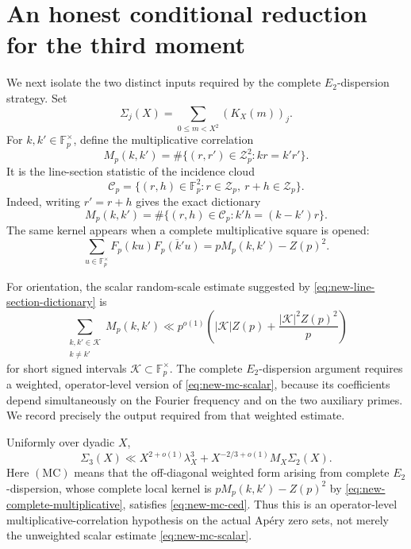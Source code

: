 \section{An honest conditional reduction for the third moment}
\label{sec:honest-hm3-reduction}

We next isolate the two distinct inputs required by the complete
\(E_2\)-dispersion strategy.  Set
\[
 \Sigma_j(X)=\sum_{0\le m<X^2}(K_X(m))_j.
\]
For \(k,k'\in\mathbb F_p^\times\), define the multiplicative
correlation
\[
 M_p(k,k')
 =\#\{(r,r')\in\mathcal Z_p^2:kr=k'r'\}.
\]
It is the line-section statistic of the incidence cloud
\[
 \mathcal C_p
 =\{(r,h)\in\mathbb F_p^2:
       r\in\mathcal Z_p,\ r+h\in\mathcal Z_p\}.
\]
Indeed, writing \(r'=r+h\) gives the exact dictionary
\begin{equation}
 M_p(k,k')
 =\#\{(r,h)\in\mathcal C_p:
        k'h=(k-k')r\}.
 \label{eq:new-line-section-dictionary}
\end{equation}
The same kernel appears when a complete multiplicative square is
opened:
\begin{equation}
 \sum_{u\in\mathbb F_p^\times}
 F_p(ku)\overline{F_p(k'u)}
 =pM_p(k,k')-Z(p)^2.
 \label{eq:new-complete-multiplicative}
\end{equation}

For orientation, the scalar random-scale estimate suggested by
\eqref{eq:new-line-section-dictionary} is
\begin{equation}
 \sum_{\substack{k,k'\in\mathscr K\\k\ne k'}}
 M_p(k,k')
 \ll p^{o(1)}
 \left(
   |\mathscr K|Z(p)
   +\frac{|\mathscr K|^2Z(p)^2}{p}
 \right)
 \label{eq:new-mc-scalar}
\end{equation}
for short signed intervals \(\mathscr K\subset\mathbb F_p^\times\).
The complete \(E_2\)-dispersion argument requires a weighted,
operator-level version of \eqref{eq:new-mc-scalar}, because its
coefficients depend simultaneously on the Fourier frequency and on
the two auxiliary primes.  We record precisely the output required
from that weighted estimate.

\begin{hypothesis}
\label{hyp:mc-ced}
Uniformly over dyadic \(X\),
\begin{equation}
 \Sigma_3(X)
 \ll
 X^{2+o(1)}\lambda_X^3
 +X^{-2/3+o(1)}M_X\Sigma_2(X).
 \label{eq:new-mc-ced}
\end{equation}
Here \((\mathrm{MC})\) means that the off-diagonal weighted form
arising from complete \(E_2\)-dispersion, whose complete local kernel
is \(pM_p(k,k')-Z(p)^2\) by
\eqref{eq:new-complete-multiplicative}, satisfies
\eqref{eq:new-mc-ced}.  Thus this is an operator-level
multiplicative-correlation hypothesis on the actual Ap\'ery zero sets,
not merely the unweighted scalar estimate
\eqref{eq:new-mc-scalar}.
\end{hypothesis}

